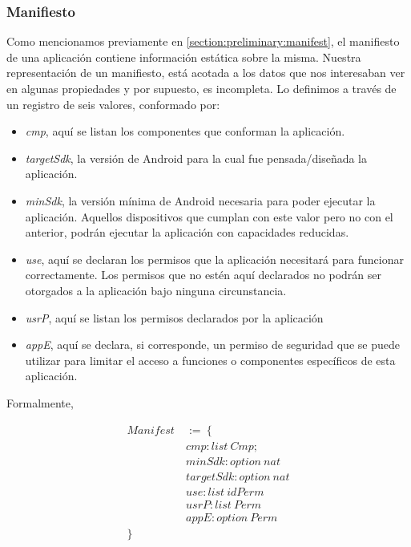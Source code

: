 \subsubsection*{Manifiesto}
Como mencionamos previamente en \ref{section:preliminary:manifest}, el manifiesto de una aplicación
contiene información estática sobre la misma. Nuestra representación de un manifiesto, está acotada
a los datos que nos interesaban ver en algunas propiedades y por supuesto, es incompleta. Lo
definimos a través de un registro de seis valores, conformado por:

\begin{itemize}
    \item \textit{cmp}, aquí se listan los componentes que conforman la aplicación.
    \item \textit{targetSdk}, la versión de Android para la cual fue pensada/diseñada la aplicación.
    \item \textit{minSdk}, la versión mínima de Android necesaria para poder ejecutar la aplicación.
          Aquellos dispositivos que cumplan con este valor pero no con el anterior, podrán ejecutar
          la aplicación con capacidades reducidas.
    \item \textit{use}, aquí se declaran los permisos que la aplicación necesitará para funcionar
          correctamente. Los permisos que no estén aquí declarados no podrán ser otorgados a la
          aplicación bajo ninguna circunstancia.
    \item \textit{usrP}, aquí se listan los permisos declarados por la aplicación
    \item \textit{appE}, aquí se declara, si corresponde, un permiso de seguridad que se puede
          utilizar para limitar el acceso a funciones o componentes específicos de esta aplicación.
\end{itemize}

Formalmente,

\begin{align*}
    Manifest\  & :=\ \{                 \\
               & cmp: list\ Cmp;        \\
               & minSdk: option\ nat    \\
               & targetSdk: option\ nat \\
               & use: list\ idPerm      \\
               & usrP: list\ Perm       \\
               & appE: option\ Perm     \\
    \}
\end{align*}

